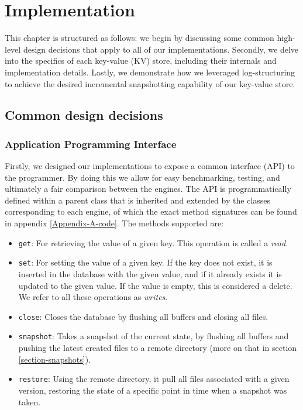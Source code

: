 
\chapter{Implementation}

\label{Chapter3-implementation}

This chapter is structured as follows: we begin by discussing some common high-level design decisions that apply to all of our implementations.
Secondly, we delve into the specifics of each key-value (KV) store, including their internals and implementation details.
Lastly, we demonstrate how we leveraged log-structuring to achieve the desired incremental snapshotting capability of our key-value store.

\section{Common design decisions}

\subsection{Application Programming Interface}

Firstly, we designed our implementations to expose a common interface (API) to the programmer.
By doing this we allow for easy benchmarking, testing, and ultimately a fair comparison between the engines.
The API is programmatically defined within a parent class that is inherited and extended by the classes corresponding to each engine, of which the exact method signatures can be found in appendix \ref{Appendix-A-code}.
The methods supported are:

\begin{itemize}
    \item \verb"get": For retrieving the value of a given key. This operation is called a \textit{read}.
    \item \verb"set": For setting the value of a given key. If the key does not exist, it is inserted in the database with the given value, and if it already exists it is updated to the given value. If the value is empty, this is considered a delete. We refer to all these operations as \textit{writes}.
    \item \verb"close": Closes the database by flushing all buffers and closing all files.
    \item \verb"snapshot": Takes a snapshot of the current state, by flushing all buffers and pushing the latest created files to a remote directory (more on that in section \ref{section-snapshots}).
    \item \verb"restore": Using the remote directory, it pull all files  associated with a given version, restoring the state of a specific point in time when a snapshot was taken.
\end{itemize}

